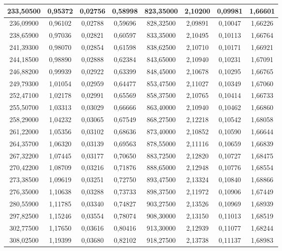 \documentclass[a4paper,12pt]{article}
\numberwithin{equation}{section}
\begin{document}
\begin{appendices}
\begin{longtable}[c]{|c|c|c|c|c|c|c|c|}
233,50500	&	0,95372	&	0,02756	&	0,58998	&	823,35000	&	2,10200	&	0,09981	&	1,66601	\\\hline
236,09900	&	0,96102	&	0,02788	&	0,59696	&	828,32500	&	2,09891	&	0,10047	&	1,66226	\\\hline
238,65900	&	0,97036	&	0,02821	&	0,60597	&	833,35000	&	2,10495	&	0,10113	&	1,66764	\\\hline
241,39300	&	0,98070	&	0,02854	&	0,61598	&	838,62500	&	2,10710	&	0,10171	&	1,66921	\\\hline
244,18500	&	0,98890	&	0,02888	&	0,62384	&	843,65000	&	2,10940	&	0,10231	&	1,67091	\\\hline
246,88200	&	0,99939	&	0,02922	&	0,63399	&	848,45000	&	2,10678	&	0,10295	&	1,66765	\\\hline
249,79300	&	1,01054	&	0,02959	&	0,64477	&	853,47500	&	2,11027	&	0,10349	&	1,67060	\\\hline
252,47100	&	1,02178	&	0,02991	&	0,65569	&	858,37500	&	2,10765	&	0,10414	&	1,66733	\\\hline
255,50700	&	1,03313	&	0,03029	&	0,66666	&	863,40000	&	2,10940	&	0,10462	&	1,66860	\\\hline
258,29000	&	1,04232	&	0,03065	&	0,67549	&	868,27500	&	2,12218	&	0,10542	&	1,68058	\\\hline
261,22000	&	1,05356	&	0,03102	&	0,68636	&	873,40000	&	2,10852	&	0,10590	&	1,66644	\\\hline
264,35700	&	1,06320	&	0,03139	&	0,69563	&	878,55000	&	2,11116	&	0,10659	&	1,66839	\\\hline
267,32200	&	1,07445	&	0,03177	&	0,70650	&	883,72500	&	2,12820	&	0,10727	&	1,68475	\\\hline
270,42200	&	1,08709	&	0,03216	&	0,71876	&	888,65000	&	2,12948	&	0,10776	&	1,68554	\\\hline
273,38500	&	1,09619	&	0,03251	&	0,72750	&	893,47500	&	2,13324	&	0,10840	&	1,68866	\\\hline
276,35000	&	1,10638	&	0,03288	&	0,73733	&	898,37500	&	2,11972	&	0,10906	&	1,67449	\\\hline
280,55900	&	1,11785	&	0,03340	&	0,74827	&	903,27500	&	2,13526	&	0,10969	&	1,68939	\\\hline
297,82500	&	1,15246	&	0,03554	&	0,78074	&	908,30000	&	2,13150	&	0,11013	&	1,68519	\\\hline
302,77500	&	1,17650	&	0,03616	&	0,80416	&	913,30000	&	2,12939	&	0,11077	&	1,68244	\\\hline
308,02500	&	1,19399	&	0,03680	&	0,82102	&	918,27500	&	2,13738	&	0,11137	&	1,68983	\\\hline

\end{longtable}
\end{appendices}
\end{document}
